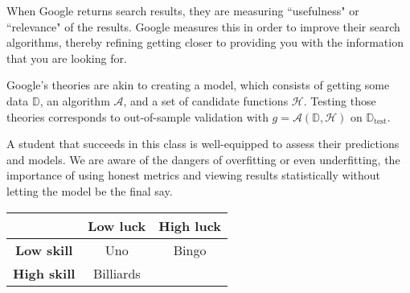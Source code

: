 \documentclass[12pt]{article}
\begin{document}
\begin{enumerate}

When Google returns search results, they are measuring ``usefulness"
or ``relevance" of the results. Google measures this in order to improve
their search algorithms, thereby refining getting closer to providing you
with the information that you are looking for.


Google's theories are akin to creating a model, which consists of getting some
data $\mathbb{D}$, an algorithm $\mathcal{A}$, and a set of candidate functions
$\mathcal{H}$. Testing those theories corresponds to out-of-sample validation with
$g = \mathcal{A}(\mathbb{D}, \mathcal{H})$ on $\mathbb{D}_{\text{test}}$.


A student that succeeds in this class is well-equipped to assess their predictions
and models. We are aware of the dangers of overfitting or even underfitting,
the importance of using honest metrics and viewing results statistically
without letting the model be the final say.


\begin{center}
	\begin{tabular}{|c|c|c|}
		\hline
		{} & \textbf{Low luck} & \textbf{High luck} \\
		\hline
		\textbf{Low skill} & Uno & Bingo\\
		\hline
		\textbf{High skill} & Billiards & \\
		\hline
	\end{tabular}
\end{center}



\end{enumerate}
\end{document}
